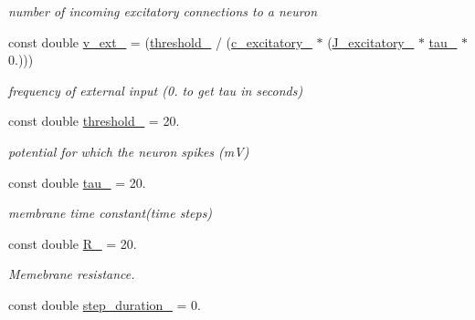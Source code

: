 \begin{DoxyCompactItemize}
\begin{DoxyCompactList}\small\item\em number of incoming excitatory connections to a neuron \end{DoxyCompactList}\item 
\hypertarget{classNeuron_aaf87415913fd2dafaacc82049a5ec91c}{const double \hyperlink{classNeuron_aaf87415913fd2dafaacc82049a5ec91c}{v\-\_\-ext\-\_\-} = (\hyperlink{classNeuron_a20b1984aaee7bd9c2edc5cc20d04727b}{threshold\-\_\-} / (\hyperlink{classNeuron_accbc344e3d3e3a44073b251c647727bd}{c\-\_\-excitatory\-\_\-} $\ast$ (\hyperlink{classNeuron_a421f5b5740b099f71b17592bb3d993f5}{J\-\_\-excitatory\-\_\-} $\ast$ \hyperlink{classNeuron_a1481bca33df7aad735ea8ef8c99c585e}{tau\-\_\-} $\ast$ 0.)))}\label{classNeuron_aaf87415913fd2dafaacc82049a5ec91c}

\begin{DoxyCompactList}\small\item\em frequency of external input (0. to get tau in seconds) \end{DoxyCompactList}\item 
\hypertarget{classNeuron_a20b1984aaee7bd9c2edc5cc20d04727b}{const double \hyperlink{classNeuron_a20b1984aaee7bd9c2edc5cc20d04727b}{threshold\-\_\-} = 20.}\label{classNeuron_a20b1984aaee7bd9c2edc5cc20d04727b}

\begin{DoxyCompactList}\small\item\em potential for which the neuron spikes (m\-V) \end{DoxyCompactList}\item 
\hypertarget{classNeuron_a1481bca33df7aad735ea8ef8c99c585e}{const double \hyperlink{classNeuron_a1481bca33df7aad735ea8ef8c99c585e}{tau\-\_\-} = 20.}\label{classNeuron_a1481bca33df7aad735ea8ef8c99c585e}

\begin{DoxyCompactList}\small\item\em membrane time constant(time steps) \end{DoxyCompactList}\item 
\hypertarget{classNeuron_a7fd5b39f2c052f084051cbd687987fc7}{const double \hyperlink{classNeuron_a7fd5b39f2c052f084051cbd687987fc7}{R\-\_\-} = 20.}\label{classNeuron_a7fd5b39f2c052f084051cbd687987fc7}

\begin{DoxyCompactList}\small\item\em Memebrane resistance. \end{DoxyCompactList}\item 
\hypertarget{classNeuron_a5162647f33e71bc157470ddc2f7d5118}{const double \hyperlink{classNeuron_a5162647f33e71bc157470ddc2f7d5118}{step\-\_\-duration\-\_\-} = 0.}\label{classNeuron_a5162647f33e71bc157470ddc2f7d5118}


\end{DoxyCompactItemize}
